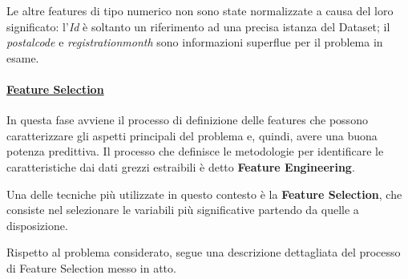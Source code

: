 Le altre features di tipo numerico non sono state normalizzate a causa del loro significato: l'\textit{Id} è soltanto un riferimento ad una precisa istanza del Dataset; il \textit{postal\textunderscore code} e \textit{registration\textunderscore month} sono informazioni superflue per il problema in esame.
\bigskip
\bigskip

\paragraph{\textcolor[HTML]{000099}{\underline{Feature Selection}}}
In questa fase avviene il processo di definizione delle features che possono caratterizzare gli aspetti principali del problema e, quindi, avere una buona potenza predittiva.
Il processo che definisce le metodologie per identificare le caratteristiche dai dati grezzi estraibili è detto \textbf{Feature Engineering}.

Una delle tecniche più utilizzate in questo contesto è la \textbf{Feature Selection}, che consiste nel selezionare le variabili più significative partendo da quelle a disposizione.

Rispetto al problema considerato, segue una descrizione dettagliata del processo di Feature Selection messo in atto.

